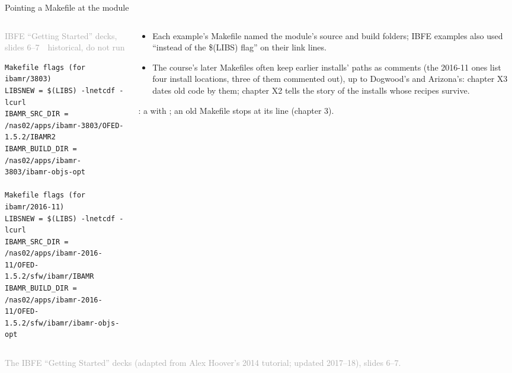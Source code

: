 \documentclass[aspectratio=169,11pt]{beamer}
\newcommand{\sourcecredit}[1]{\vfill\begin{flushright}\tiny\textcolor{DarkGray}{#1}\end{flushright}}
\newcommand{\hist}[1]{{\tiny\sffamily\textcolor{DarkGray}{#1\ \textbullet\ historical, do not run}}\par\nointerlineskip\vspace{0.3mm}}
\begin{document}
\begin{frame}[fragile]{Pointing a Makefile at the module}
\label{fr:makemodule}
\begin{columns}[T,onlytextwidth]
\begin{column}{0.56\textwidth}
\hist{IBFE ``Getting Started'' decks, slides 6--7}
\begin{lstlisting}[style=hist]
Makefile flags (for ibamr/3803)
LIBSNEW = $(LIBS) -lnetcdf -lcurl
IBAMR_SRC_DIR = /nas02/apps/ibamr-3803/OFED-1.5.2/IBAMR2
IBAMR_BUILD_DIR = /nas02/apps/ibamr-3803/ibamr-objs-opt

Makefile flags (for ibamr/2016-11)
LIBSNEW = $(LIBS) -lnetcdf -lcurl
IBAMR_SRC_DIR = /nas02/apps/ibamr-2016-11/OFED-1.5.2/sfw/ibamr/IBAMR
IBAMR_BUILD_DIR = /nas02/apps/ibamr-2016-11/OFED-1.5.2/sfw/ibamr/ibamr-objs-opt
\end{lstlisting}
\end{column}
\begin{column}{0.41\textwidth}
\footnotesize
\begin{itemize}\setlength{\itemsep}{2pt}
  \item Each example's Makefile named the module's source and build folders; IBFE examples also used  ``instead of the \$(LIBS) flag'' on their link lines.
  \item The course's later Makefiles often keep earlier installs' paths as comments (the 2016-11 ones list four install locations, three of them commented out), up to Dogwood's and Arizona's: chapter X3 dates old code by them; chapter X2 tells the story of the installs whose recipes survive.
\end{itemize}
\vspace{1mm}
: a  with ; an old Makefile stops at its  line (chapter 3).
\end{column}
\end{columns}
\sourcecredit{The IBFE ``Getting Started'' decks (adapted from Alex Hoover's 2014 tutorial; updated 2017--18), slides 6--7.}
\end{frame}
\end{document}
